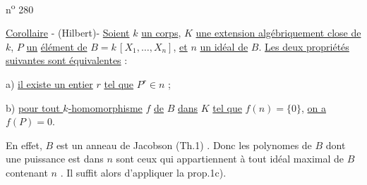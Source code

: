 \hfill n\textsuperscript{o} 280

\uline{Corollaire} - (Hilbert)- \uline{Soient} $k$ \uline{un corps}, $K$ \uline{une extension algébriquement close de} $k$, $P$ \uline{un} \uline{élément de} $B=k\,[X_1,\ldots,X_n]$, \uline{et} $n$ \uline{un idéal de} $B$. \uline{Les deux propriétés suivantes sont équivalentes} :

a) \uline{il existe un entier} $r$ \uline{tel que} $P^r\in n$ ;

b) \uline{pour tout $k$-homomorphisme} $f$ \uline{de} $B$ \uline{dans} $K$ \uline{tel que} $f(n)=\{0\}$, \uline{on a} $f(P)=0$.

En effet, $B$ est un anneau de Jacobson (Th.1) . Donc les polynomes de $B$ dont une puissance est dans $n$ sont ceux qui appartiennent à tout idéal maximal de $B$ contenant $n$ . Il suffit alors d'appliquer la prop.1c).


